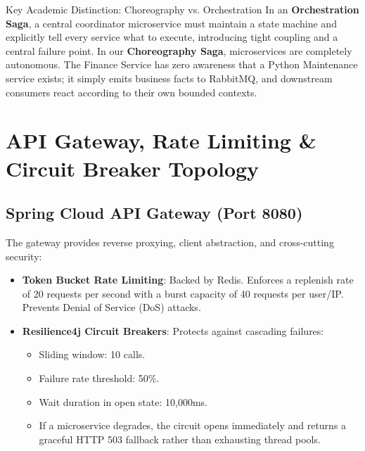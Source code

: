 \documentclass[11pt,a4paper]{article}
\begin{document}
\begin{notebox}{Key Academic Distinction: Choreography vs. Orchestration}
In an \textbf{Orchestration Saga}, a central coordinator microservice must maintain a state machine and explicitly tell every service what to execute, introducing tight coupling and a central failure point.  
In our \textbf{Choreography Saga}, microservices are completely autonomous. The Finance Service has zero awareness that a Python Maintenance service exists; it simply emits business facts to RabbitMQ, and downstream consumers react according to their own bounded contexts.
\end{notebox}

\newpage
\section{API Gateway, Rate Limiting \& Circuit Breaker Topology}

\subsection{Spring Cloud API Gateway (Port 8080)}
The gateway provides reverse proxying, client abstraction, and cross-cutting security:
\begin{itemize}
    \item \textbf{Token Bucket Rate Limiting}: Backed by Redis. Enforces a replenish rate of 20 requests per second with a burst capacity of 40 requests per user/IP. Prevents Denial of Service (DoS) attacks.
    \item \textbf{Resilience4j Circuit Breakers}: Protects against cascading failures:
    \begin{itemize}
        \item Sliding window: 10 calls.
        \item Failure rate threshold: 50\%.
        \item Wait duration in open state: 10,000ms.
        \item If a microservice degrades, the circuit opens immediately and returns a graceful HTTP 503 fallback rather than exhausting thread pools.
    \end{itemize}
\end{itemize}
\end{document}
